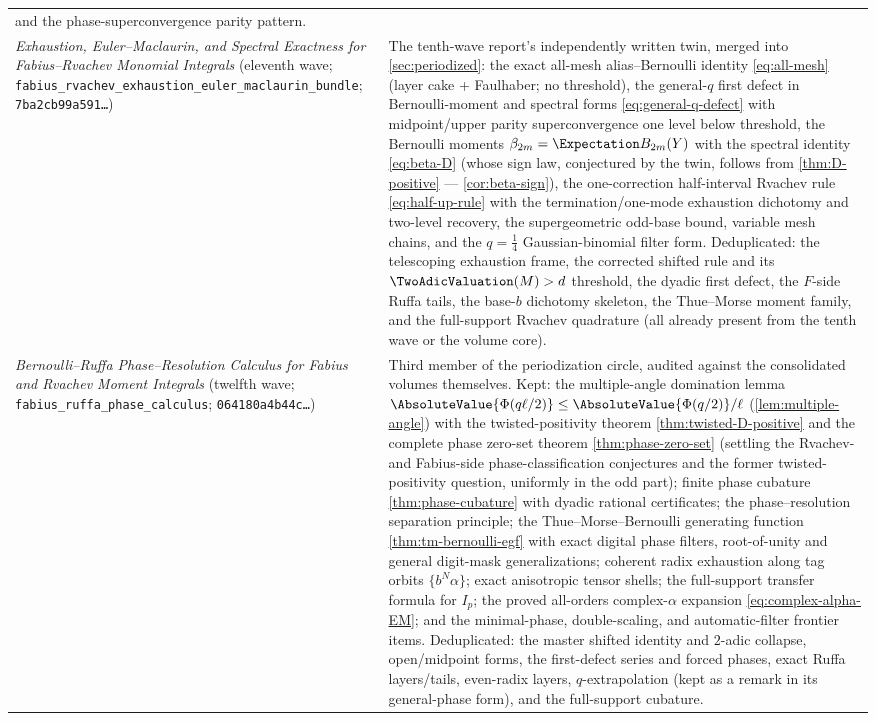 \documentclass[11pt,oneside]{article}
\numberwithin{equation}{section}
\theoremstyle{definition}
\theoremstyle{remark}
\begin{document}
\begin{center}
\begin{tabular}{@{}p{}p{}@{}}
and the phase-superconvergence parity pattern. \\
\addlinespace
\emph{Exhaustion, Euler--Maclaurin, and Spectral Exactness for
Fabius--Rvachev Monomial Integrals} (eleventh wave;
\nolinkurl{fabius_rvachev_exhaustion_euler_maclaurin_bundle};
\texttt{7ba2cb99a591\ldots})
& The tenth-wave report's independently written twin, merged into
\cref{sec:periodized}: the exact all-mesh alias--Bernoulli identity
\eqref{eq:all-mesh} (layer cake + Faulhaber; no threshold), the
general-$q$ first defect in Bernoulli-moment and spectral forms
\eqref{eq:general-q-defect} with midpoint/upper parity
superconvergence one level below threshold, the Bernoulli moments
$\beta_{2m}=\Expectation B_{2m}(Y)$ with the spectral identity
\eqref{eq:beta-D} (whose sign law, conjectured by the twin, follows
from \cref{thm:D-positive} --- \cref{cor:beta-sign}), the
one-correction half-interval Rvachev rule \eqref{eq:half-up-rule}
with the termination/one-mode exhaustion dichotomy and two-level
recovery, the supergeometric odd-base bound, variable mesh chains,
and the $q=\tfrac14$ Gaussian-binomial filter form.  Deduplicated:
the telescoping exhaustion frame, the corrected shifted rule and its
$\TwoAdicValuation(M)>d$ threshold, the dyadic first defect, the $F$-side Ruffa
tails, the base-$b$ dichotomy skeleton, the Thue--Morse moment
family, and the full-support Rvachev quadrature (all already present
from the tenth wave or the volume core). \\
\addlinespace
\emph{Bernoulli--Ruffa Phase--Resolution Calculus for Fabius and
Rvachev Moment Integrals} (twelfth wave;
\nolinkurl{fabius_ruffa_phase_calculus};
\texttt{064180a4b44c\ldots})
& Third member of the periodization circle, audited against the
consolidated volumes themselves.  Kept: the multiple-angle domination
lemma $\AbsoluteValue{\Phi(q\ell/2)}\le\AbsoluteValue{\Phi(q/2)}/\ell$
(\cref{lem:multiple-angle}) with the twisted-positivity theorem
\cref{thm:twisted-D-positive} and the complete phase zero-set theorem
\cref{thm:phase-zero-set} (settling the Rvachev- and Fabius-side
phase-classification conjectures and the former twisted-positivity
question, uniformly in the odd part); finite phase cubature
\cref{thm:phase-cubature} with dyadic rational certificates; the
phase--resolution separation principle; the Thue--Morse--Bernoulli
generating function \cref{thm:tm-bernoulli-egf} with exact digital
phase filters, root-of-unity and general digit-mask generalizations;
coherent radix exhaustion along tag orbits $\{b^N\alpha\}$; exact
anisotropic tensor shells; the full-support transfer formula for
$I_p$; the proved all-orders complex-$\alpha$ expansion
\eqref{eq:complex-alpha-EM}; and the minimal-phase, double-scaling,
and automatic-filter frontier items.  Deduplicated: the master
shifted identity and $2$-adic collapse, open/midpoint forms, the
first-defect series and forced phases, exact Ruffa layers/tails,
even-radix layers, $q$-extrapolation (kept as a remark in its
general-phase form), and the full-support cubature. \\
\bottomrule
\end{tabular}
\end{center}
\end{document}
